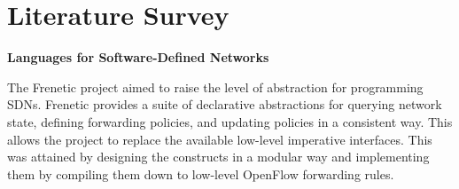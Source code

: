 
\section{Literature Survey}

\textbf{Languages for Software-Defined Networks} 

The Frenetic project aimed to raise the level of abstraction for programming SDNs. Frenetic provides a suite of declarative abstractions for querying network state, defining forwarding policies, and updating policies in a consistent way. This allows the project to replace the available low-level imperative interfaces. This was attained by designing the constructs in a modular way and implementing them by compiling them down to low-level OpenFlow forwarding rules. \cite{Foster2013}